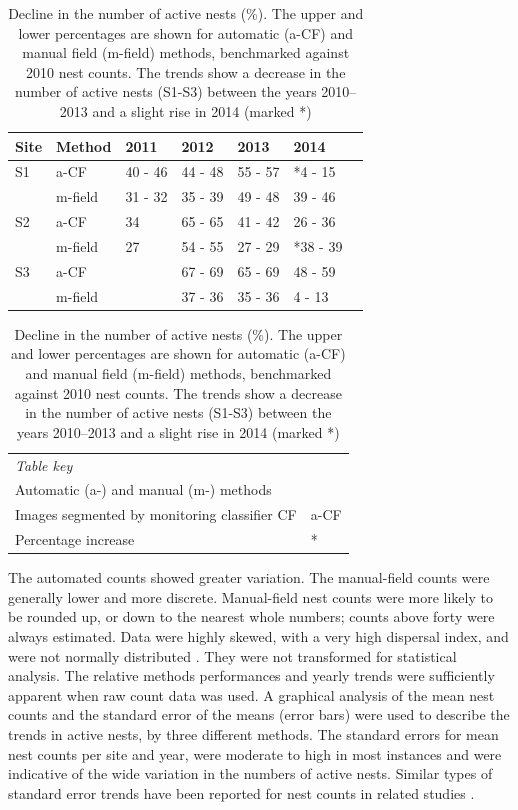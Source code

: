\begin{table}[!htbp]\myfloatalign
\caption[Decline in the number of active nests.]{Decline in the number of active nests (\%). The upper and lower percentages are shown for automatic (a-CF) and manual field (m-field) methods, benchmarked against 2010 nest counts. The trends show a decrease in the number of active nests (S1-S3) between the years 2010--2013 and a slight rise in 2014 (marked *) }\label{tab:change}
\begin{tabular}{p{0.3in}llllll} \\ \toprule
Site & Method	 &	2011 &	2012 &	2013 &	2014 &	 \\ \midrule
S1 &	a-CF &	40 - 46 &	44 - 48 &	55 - 57 &	*4 - 15 &	 \\
 &	m-field &	31 - 32 &	35 - 39 &	49 - 48 &	39 - 46 &	 \\  
S2 &	a-CF &	34 &	65 - 65 &	41 - 42 &	26 - 36 &	 \\
 &	m-field &	27 &	54 - 55 &	27 - 29 &	*38 - 39 &	 \\ 
S3 &	a-CF &	 &	67 - 69 &	65 - 69 &	48 - 59 &	 \\ 
&	m-field &	 &	37 - 36 &	35 - 36 &	4 - 13 &	 \\  \bottomrule
\end{tabular}
\begin{tabular}{p{3.6in}l} \\
\emph{Table key} & \\ 
Automatic (a-) and manual (m-) methods &\\
Images segmented by monitoring classifier CF  &  a-CF \\
Percentage increase & *\\
\end{tabular}
\end{table}

The automated counts showed greater variation. The manual-field counts
were generally lower and more discrete. Manual-field nest counts were more likely to be rounded up, or down to the nearest whole numbers; counts above forty were always estimated. Data were highly skewed, with a very high dispersal index, and  were not normally distributed \cite{Fletcher2005,Ridout1998}. They were not transformed for statistical analysis. The relative methods performances and yearly trends were sufficiently apparent when raw count data was used. A graphical analysis of the mean nest counts and the standard error of the means (error bars) were used to describe the trends in active nests, by three different methods. The standard errors for mean nest counts per site and year, were moderate to high in most instances and were indicative of the wide variation in the numbers of active nests. Similar types of standard error trends have been reported for nest counts in related studies \cite{Cane2008, Bischoff2003, Vinchesi2014}.

